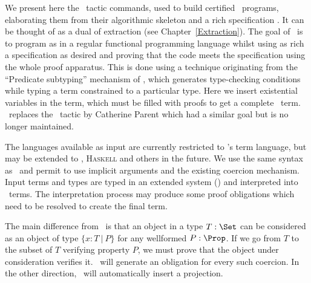\achapter{\Program{}}
\label{Program}

We present here the \Program\ tactic commands, used to build certified
\Coq\ programs, elaborating them from their algorithmic skeleton and a
rich specification \cite{Sozeau06}. It can be thought of as a dual of extraction
(see Chapter~\ref{Extraction}). The goal of \Program~is to program as in a regular
functional programming language whilst using as rich a specification as 
desired and proving that the code meets the specification using the whole \Coq{} proof
apparatus. This is done using a technique originating from the
``Predicate subtyping'' mechanism of \PVS \cite{Rushby98}, which generates type-checking
conditions while typing a term constrained to a particular type. 
Here we insert existential variables in the term, which must be filled
with proofs to get a complete \Coq\ term. \Program\ replaces the
\Program\ tactic by Catherine Parent \cite{Parent95b} which had a similar goal but is no longer
maintained.

The languages available as input are currently restricted to \Coq's term
language, but may be extended to \ocaml{}, \textsc{Haskell} and others
in the future. We use the same syntax as \Coq\ and permit to use implicit
arguments and the existing coercion mechanism.
Input terms and types are typed in an extended system (\Russell) and
interpreted into \Coq\ terms. The interpretation process may produce
some proof obligations which need to be resolved to create the final term.

The main difference from \Coq\ is that an object in a type $T : \Set$
can be considered as an object of type $\{ x : T~|~P\}$ for any
wellformed $P : \Prop$. 
If we go from $T$ to the subset of $T$ verifying property $P$, we must
prove that the object under consideration verifies it. \Russell\ will
generate an obligation for every such coercion. In the other direction,
\Russell\ will automatically insert a projection.

